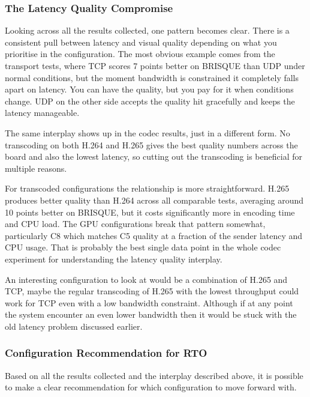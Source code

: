 \subsubsection{The Latency Quality Compromise}\label{subsubsec:latency_quality_tradeoff}

Looking across all the results collected, one pattern becomes clear. There is a consistent pull between latency and visual quality depending on what you prioritise in the configuration. The most obvious example comes from the transport tests, where TCP scores 7 points better on BRISQUE than UDP under normal conditions, but the moment bandwidth is constrained it completely falls apart on latency. You can have the quality, but you pay for it when conditions change. UDP on the other side accepts the quality hit gracefully and keeps the latency manageable.

The same interplay shows up in the codec results, just in a different form. No transcoding on both H.264 and H.265 gives the best quality numbers across the board and also the lowest latency, so cutting out the transcoding is beneficial for multiple reasons.

For transcoded configurations the relationship is more straightforward. H.265 produces better quality than H.264 across all comparable tests, averaging around 10 points better on BRISQUE, but it costs significantly more in encoding time and CPU load. The GPU configurations break that pattern somewhat, particularly C8 which matches C5 quality at a fraction of the sender latency and CPU usage. That is probably the best single data point in the whole codec experiment for understanding the latency quality interplay.

An interesting configuration to look at would be a combination of H.265 and TCP, maybe the regular transcoding of H.265 with the lowest throughput could work for TCP even with a low bandwidth constraint. Although if at any point the system encounter an even lower bandwidth then it would be stuck with the old latency problem discussed earlier. 

\subsubsection{Configuration Recommendation for RTO}\label{subsubsec:recommendation}

Based on all the results collected and the interplay described above, it is possible to make a clear recommendation for which configuration to move forward with.

